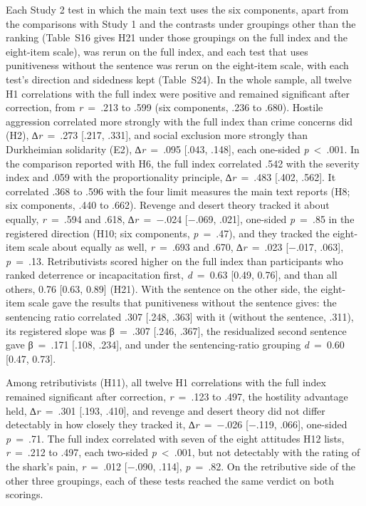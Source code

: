 Each Study 2 test in which the main text uses the six components, apart from the comparisons with Study 1 and the contrasts under groupings other than the ranking (Table~S16 gives H21 under those groupings on the full index and the eight-item scale), was rerun on the full index, and each test that uses punitiveness without the sentence was rerun on the eight-item scale, with each test's direction and sidedness kept (Table~S24). In the whole sample, all twelve H1 correlations with the full index were positive and remained significant after correction, from \emph{r}~=~.213 to .599 (six components, .236 to .680). Hostile aggression correlated more strongly with the full index than crime concerns did (H2), ∆\emph{r}~=~.273 {[}.217, .331{]}, and social exclusion more strongly than Durkheimian solidarity (E2), ∆\emph{r}~=~.095 {[}.043, .148{]}, each one-sided \emph{p}~\textless{}~.001. In the comparison reported with H6, the full index correlated .542 with the severity index and .059 with the proportionality principle, ∆\emph{r}~=~.483 {[}.402, .562{]}. It correlated .368 to .596 with the four limit measures the main text reports (H8; six components, .440 to .662). Revenge and desert theory tracked it about equally, \emph{r}~=~.594 and .618, ∆\emph{r}~=~−.024 {[}−.069, .021{]}, one-sided \emph{p}~=~.85 in the registered direction (H10; six components, \emph{p}~=~.47), and they tracked the eight-item scale about equally as well, \emph{r}~=~.693 and .670, ∆\emph{r}~=~.023 {[}−.017, .063{]}, \emph{p}~=~.13. Retributivists scored higher on the full index than participants who ranked deterrence or incapacitation first, \emph{d}~=~0.63 {[}0.49, 0.76{]}, and than all others, 0.76 {[}0.63, 0.89{]} (H21). With the sentence on the other side, the eight-item scale gave the results that punitiveness without the sentence gives: the sentencing ratio correlated .307 {[}.248, .363{]} with it (without the sentence, .311), its registered slope was β~=~.307 {[}.246, .367{]}, the residualized second sentence gave β~=~.171 {[}.108, .234{]}, and under the sentencing-ratio grouping \emph{d}~=~0.60 {[}0.47, 0.73{]}.

Among retributivists (H11), all twelve H1 correlations with the full index remained significant after correction, \emph{r}~=~.123 to .497, the hostility advantage held, ∆\emph{r}~=~.301 {[}.193, .410{]}, and revenge and desert theory did not differ detectably in how closely they tracked it, ∆\emph{r}~=~−.026 {[}−.119, .066{]}, one-sided \emph{p}~=~.71. The full index correlated with seven of the eight attitudes H12 lists, \emph{r}~=~.212 to .497, each two-sided \emph{p}~\textless{}~.001, but not detectably with the rating of the shark's pain, \emph{r}~=~.012 {[}−.090, .114{]}, \emph{p}~=~.82. On the retributive side of the other three groupings, each of these tests reached the same verdict on both scorings.

